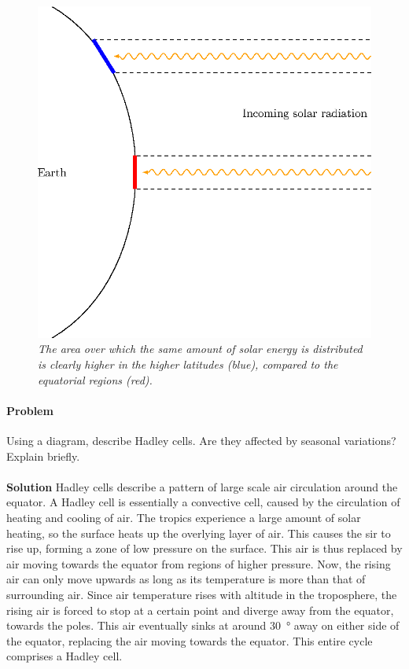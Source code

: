 \documentclass[10pt]{article}
\newcounter{prob}
\def\problem{\stepcounter{prob}\paragraph{Problem \arabic{prob}}}
\def\solution{\\\\\textbf{Solution }}
\begin{document}
        \begin{figure}[h!]
        \begin{center}
                \includegraphics[scale=0.7]{./insolation.eps}
        \end{center}
        \caption*{\it The area over which the same amount of solar energy is distributed is clearly higher in the higher latitudes (blue),
        compared to the equatorial regions (red).}
        \label{fig:insolation}
        \end{figure}

        \problem Using a diagram, describe Hadley cells. Are they affected by seasonal variations? Explain briefly.
        \solution Hadley cells describe a pattern of large scale air circulation around the equator.
        A Hadley cell is essentially a convective cell, caused by the circulation of heating and cooling of air. The tropics experience
        a large amount of solar heating, so the surface heats up the overlying layer of air. This causes the sir to rise up, forming a zone
        of low pressure on the surface. This air is thus replaced by air moving towards the equator from regions of higher pressure.
        Now, the rising air can only move upwards as long as its temperature is more than that of surrounding air. Since air temperature
        rises with altitude in the troposphere, the rising air is forced to stop at a certain point and diverge away from the equator,
        towards the poles. This air eventually sinks at around \SI{30}{\degree} away on either side of the equator, replacing the air moving
        towards the equator. This entire cycle comprises a Hadley cell.\\
\end{document}
